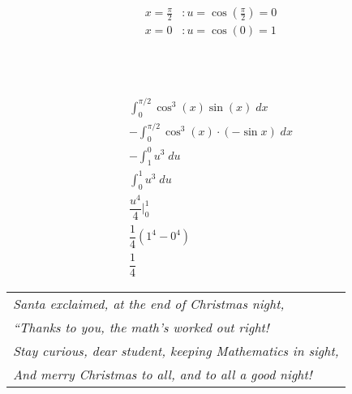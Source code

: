 \documentclass[12pt,letterpaper]{exam}
\begin{document}
\begin{questions}
\begin{minipage}[b]{0.28\textwidth}
\[\begin{aligned}
			x= \frac{\pi}{2} &\colon u= \cos(\frac{\pi}{2})= 0 \\[0.2cm]
			x= 0 &\colon u= \cos(0)= 1 \\ \\ \\ \\ \\ \\ \\ \\ \\
			\end{aligned}
			\]
		\end{minipage} \begin{minipage}[b]{0.23\textwidth}
			\[
			\begin{gathered}
			\int_0^{\pi/2} \cos^3(x) \sin(x) \;dx \\[0.1cm]
			-\int_0^{\pi/2} \cos^3(x) \cdot (-\sin x) \;dx \\[0.1cm]
			-\int_1^0 u^3 \;du \\[0.1cm]
			\int_0^1 u^3 \;du \\[0.1cm]
			\dfrac{u^4}{4} \bigg|_0^1 \\[0.1cm]
			\dfrac{1}{4} \left(1^4 - 0^4 \right) \\[0.1cm]
			\dfrac{1}{4}
			\end{gathered}
			\]
		\end{minipage}

\end{questions}


\newpage

\phantom{.} \vfill
	\begin{table}[h]
	\centering
	\begin{tabular}{l}
	{\itshape Santa exclaimed, at the end of Christmas night,} \\
	{\itshape ``Thanks to you, the math's worked out right!} \\
	{\itshape Stay curious, dear student, keeping Mathematics in sight,} \\
	{\itshape And merry Christmas to all, and to all a good night!}
	\end{tabular}
	\end{table}
\phantom{.} \vfill
\end{document}
